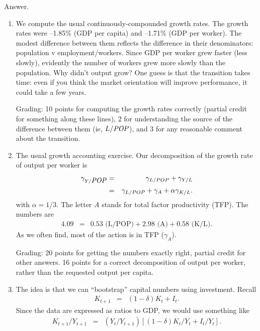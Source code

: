 \documentclass[letterpaper,12pt]{article}
\newcommand{\POP}{\mbox{\em POP\/}}
\begin{document}
\begin{enumerate}
Answer.
\begin{enumerate}

\item We compute the usual continuously-compounded growth rates.
The growth rates were --1.85\% (GDP per capita)
and --1.71\% (GDP per worker). 
The modest difference between them reflects the difference 
in their denominators:  population v employment/workers. 
Since GDP per worker grew faster (less slowly), 
evidently the number of workers
grew more slowly than the population. 
Why didn't output grow?
One guess is that the transition takes time:  
even if you think the market orientation will improve
performance, it could take a few years.  

Grading:  10 points for computing the growth rates correctly
(partial credit for something along these lines), 
2 for understanding the source of the difference between them
(ie, $L/\POP$), 
and 3 for any reasonable comment about the transition.  

\item The usual growth accounting exercise.  
Our decomposition of the growth rate of output per worker is 
\begin{eqnarray*}
        \gamma_{Y/\POP} &=& \gamma_{L/POP} + \gamma_{Y/L} \\
            &=& \gamma_{L/POP} + \gamma_A + \alpha \gamma_{K/L}  .
\end{eqnarray*} 
with $\alpha = 1/3$.
The letter $A$ stands for total factor productivity (TFP).    
The numbers are 
\begin{eqnarray*}
     4.09 &=& 0.53 \mbox{ (L/POP)} + 2.98 \mbox{ (A)} 
                +  0.58 \mbox{ (K/L)} .
\end{eqnarray*}
As we often find, most of the action is in TFP ($\gamma_A$).  

Grading: 20 points for getting the numbers exactly right, 
partial credit for other answers.  
16 points for a correct decomposition of output per worker, 
rather than the requested output per capita.  

\item The idea is that we can ``bootstrap'' capital numbers using 
investment.  
Recall
\begin{eqnarray}
    K_{t+1} &=& (1-\delta) K_t + I_t .
    \label{eq:lom-k}
\end{eqnarray} 
Since the data are expressed as ratios to GDP, we would use
something like
\begin{eqnarray*}
    K_{t+1}/Y_{t+1} &=& 
        (Y_t/Y_{t+1}) \left[ (1-\delta) K_t/Y_t + I_t/Y_t \right] .
\end{eqnarray*} 



\end{enumerate}
\end{enumerate}
\end{document}
